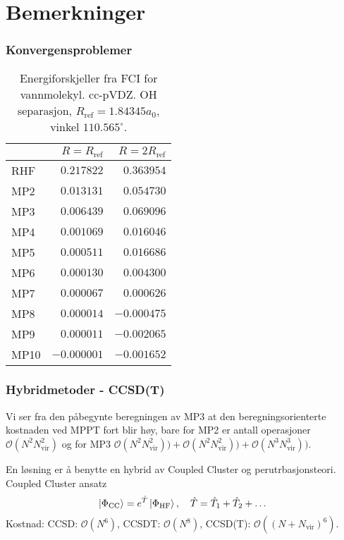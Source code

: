\documentclass{beamer}
\begin{document}
\section{Bemerkninger}

\begin{frame}
	\frametitle{Konvergensproblemer}
	
	\begin{table}
		\begin{tabular}{l r r} \hline
			& $R = R_{\text{ref}}$ & $R = 2R_{\text{ref}}$ \\ \hline
			RHF & $0.217822$  & $0.363954$ \\
			MP2 & $0.013131$  & $0.054730$ \\
			MP3 & $0.006439$& $0.069096$ \\
			MP4 & $0.001069$& $0.016046$ \\
			MP5 & $0.000511$ & $0.016686$ \\
			MP6 & $0.000130$ & $0.004300$ \\
			MP7 & $0.000067$ & $0.000626$ \\
			MP8 & $0.000014$ & $-0.000475$ \\
			MP9 & $0.000011$ & $-0.002065$ \\
			MP10&$-0.000001$&$-0.001652$ \\ \hline
		\end{tabular}
		\caption{Energiforskjeller fra FCI for vannmolekyl. cc-pVDZ. OH separasjon, $R_\text{ref}=1.843
		45a_0$, vinkel $110.565^\circ$.}
	\end{table}
	
\end{frame}

\begin{frame}
	\frametitle{Hybridmetoder - CCSD(T)}
	
		Vi ser fra den påbegynte beregningen av MP3 at den beregningsorienterte kostnaden ved MPPT fort blir høy, bare for MP2 er antall operasjoner $\mathcal{O}(N^2N_\text{vir}^2)$ og for MP3 $\mathcal{O}(N^2N_\text{vir}^2)) + \mathcal{O}(N^2N_\text{vir}^2)) + \mathcal{O}(N^3N_\text{vir}^3))$.
	
	En løsning er å benytte en hybrid av Coupled Cluster og perutrbasjonsteori. Coupled Cluster ansatz
	\begin{equation}
		\ket{\Phi_\text{CC}} = e^{\hat T}\ket{\Phi_\text{HF}}, \quad \hat T = \hat T_1 + \hat T_2 + \dots
	\end{equation}
	Kostnad: 
	CCSD: $\mathcal{O}(N^6)$, CCSDT: $\mathcal{O}(N^8)$, CCSD(T): $\mathcal{O}((N + N_\text{vir})^6)$.
	
	
\end{frame}
\end{document}
